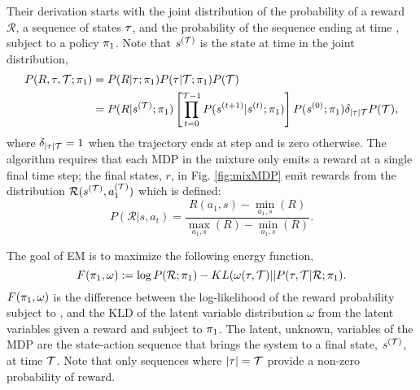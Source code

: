     Their derivation starts with the joint distribution of the probability of a reward $\mathcal{R}$, a sequence of
    states $\tau$, and the probability of the sequence ending at time \Tau, subject to a policy $\pi_{1}$. Note that
    $s^{(\mathcal{T})}$ is the state at time \Tau in the joint distribution,
    \begin{equation} \label{eq:em_joint_dist}
        \begin{split}
            P(R,\tau,\mathcal{T};\pi_{1})
                & = P(R|\tau;\pi_{1})P(\tau|\mathcal{T};\pi_{1})P(\mathcal{T}) \\
                & = P(R|s^{(\mathcal{T})};\pi_{1})\left[\prod_{t=0}^{\mathcal{T}-1}P(s^{(t+1)}|s^{(t)};\pi_{1})\right]
                        P(s^{(0)};\pi_{1})\delta_{|\tau|\mathcal{T}}P(\mathcal{T}),
        \end{split}
    \end{equation}
    where $\delta_{|\tau|\mathcal{T}}=1$ when the trajectory ends at step \Tau and is zero otherwise. The algorithm requires
    that each MDP in the mixture only emits a reward at a single final time step; the final states, $r$, in Fig.
    \ref{fig:mixMDP} emit rewards from the distribution $\mathcal{R}(s^{(\mathcal{T})},a_1^{(\mathcal{T})})$ which is defined:
    \[
    P(\mathcal{R}|s,a_t) = \frac{R(a_1,s) - \min_{a_1,s}(R)}{\max_{a_1,s}(R) - \min_{a_1,s}(R)}.
    \]

    \par
    The goal of EM is to maximize the following energy function,
    \[
    F(\pi_{1},\omega) := \log P(\mathcal{R};\pi_{1}) - KL(\omega(\tau,\mathcal{T})||P(\tau,\mathcal{T}|\mathcal{R};\pi_{1}).
    \]
    $F(\pi_{1},\omega)$ is the difference between the log-likelihood of the reward probability subject to ,
    and the \ac{KLD} of the latent variable distribution $\omega$ from the latent variables given a reward and subject
    to $\pi_{1}$. The latent, unknown, variables of the \ac{MDP} are the state-action sequence that brings the system
    to a final state, $s^{(\mathcal{T})}$, at time $\mathcal{T}$. Note that only sequences where $|\tau|= \mathcal{T}$ provide a non-zero
    probability of reward.



